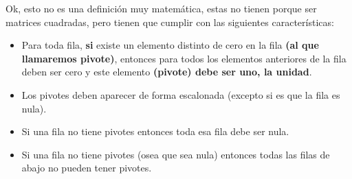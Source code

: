 \documentclass[12pt, fleqn]{report}                             %
\theoremstyle{break}                                            %
\begin{document}
                Ok, esto no es una definición muy matemática, estas no tienen porque
                ser matrices cuadradas, pero tienen que cumplir con las siguientes
                características:
                \begin{itemize}
                    \item 
                        Para toda fila, \textbf{si} existe un elemento distinto de cero en la fila
                        \textbf{(al que llamaremos pivote)}, entonces para todos los
                        elementos anteriores  de la fila deben ser cero y este elemento
                        \textbf{(pivote) debe ser uno, la unidad}.
                    \item
                        Los pivotes deben aparecer de forma escalonada (excepto si es que la
                        fila es nula).
                    \item
                        Si una fila no tiene pivotes entonces toda esa fila debe ser nula.
                    \item
                        Si una fila no tiene pivotes (osea que sea nula) entonces todas
                        las filas de abajo no pueden tener pivotes.
                \end{itemize}
\end{document}
